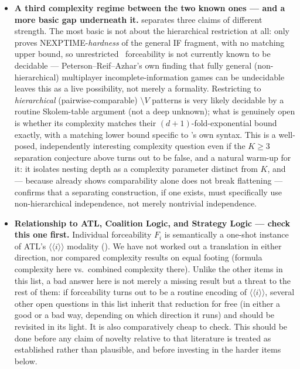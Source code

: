 \begin{itemize}
  \item \textbf{A third complexity regime between the two known ones ---
  and a more basic gap underneath it.}  separates
  three claims of different strength. The most basic is not about the
  hierarchical restriction at all:  only proves
  NEXPTIME-\emph{hardness} of the general IF fragment, with no matching
  upper bound, so unrestricted \KFOL\ forceability is not currently known to
  be decidable --- Peterson--Reif--Azhar's own finding that fully general
  (non-hierarchical) multiplayer incomplete-information games can be
  undecidable~\cite{PetersonReifAzhar2001LowerBounds,PetersonReifAzhar2002DecisionAlgorithms}
  leaves this as a live possibility, not merely a formality. Restricting to
  \emph{hierarchical} (pairwise-comparable) $\setminus V$ patterns is very
  likely decidable by a routine Skolem-table argument (not a deep unknown);
  what is genuinely open is whether its complexity matches their
  $(d{+}1)$-fold-exponential bound exactly, with a matching lower bound
  specific to \KFOL's own syntax. This is a well-posed, independently
  interesting complexity question even
  if the $K\ge 3$ separation conjecture above turns out to be false, and a
  natural warm-up for it: it isolates nesting depth as a complexity
  parameter distinct from $K$, and --- because
   already shows comparability alone
  does not break flattening --- confirms that a separating construction, if
  one exists, must specifically use non-hierarchical independence, not
  merely nontrivial independence.

  \item \textbf{Relationship to ATL, Coalition Logic, and Strategy Logic ---
  check this one first.} Individual forceability $F_i$ is semantically a
  one-shot instance of ATL's $\langle\!\langle i \rangle\!\rangle$ modality
  (). We have not worked out a translation in either
  direction, nor compared complexity results on equal footing (formula
  complexity here vs.\ combined complexity there). Unlike the other items in
  this list, a bad answer here is not merely a missing result but a threat to
  the rest of them: if forceability turns out to be a routine encoding of
  $\langle\!\langle i \rangle\!\rangle$, several other open questions in this
  list inherit that reduction for free (in either a good or a bad way,
  depending on which direction it runs) and should be revisited in its light.
  It is also comparatively cheap to check. This should be done before any
  claim of novelty relative to that literature is treated as established
  rather than plausible, and before investing in the harder items below.


\end{itemize}
